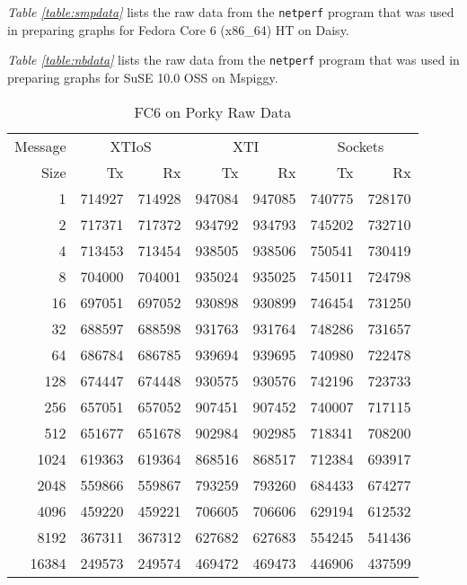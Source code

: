 \documentclass[letterpaper,final,notitlepage,twocolumn,10pt,twoside]{article}
\begin{document}
\begin{appendix}
\textit{Table \ref{table:smpdata}} lists the raw data from the \texttt{netperf} program that was
used in preparing graphs for Fedora Core 6 (x86\_64) HT on Daisy.

\textit{Table \ref{table:nbdata}} lists the raw data from the \texttt{netperf} program that was used
in preparing graphs for SuSE 10.0 OSS on Mspiggy.

\begin{table}[hbp]
\footnotesize
\begin{center}
\setlength{\tabcolsep}{0.2em}
\setlength{\arraycolsep}{0.2em}
\begin{tabular}{rrrrrrr}\\
Message & \multicolumn{2}{c}{XTIoS} & \multicolumn{2}{c}{XTI} & \multicolumn{2}{c}{Sockets}\\
Size & Tx & Rx & Tx & Rx & Tx & Rx\\
\hline
\hline
1 & 714927 & 714928 & 947084 & 947085 & 740775 & 728170\\
2 & 717371 & 717372 & 934792 & 934793 & 745202 & 732710\\
4 & 713453 & 713454 & 938505 & 938506 & 750541 & 730419\\
8 & 704000 & 704001 & 935024 & 935025 & 745011 & 724798\\
16 & 697051 & 697052 & 930898 & 930899 & 746454 & 731250\\
32 & 688597 & 688598 & 931763 & 931764 & 748286 & 731657\\
64 & 686784 & 686785 & 939694 & 939695 & 740980 & 722478\\
128 & 674447 & 674448 & 930575 & 930576 & 742196 & 723733\\
256 & 657051 & 657052 & 907451 & 907452 & 740007 & 717115\\
512 & 651677 & 651678 & 902984 & 902985 & 718341 & 708200\\
1024 & 619363 & 619364 & 868516 & 868517 & 712384 & 693917\\
2048 & 559866 & 559867 & 793259 & 793260 & 684433 & 674277\\
4096 & 459220 & 459221 & 706605 & 706606 & 629194 & 612532\\
8192 & 367311 & 367312 & 627682 & 627683 & 554245 & 541436\\
16384 & 249573 & 249574 & 469472 & 469473 & 446906 & 437599\\
\hline
\end{tabular}
\end{center}
\normalsize
\caption[FC6 on Porky Raw Data]{FC6 on Porky Raw Data}
\label{table:fc6data}
\end{table}


\end{appendix}
\end{document}
